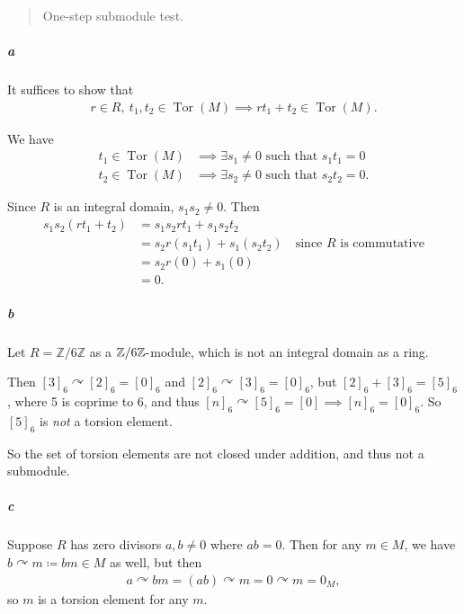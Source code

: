 \begin{solution}

\begin{quote}
One-step submodule test.
\end{quote}

\hypertarget{a-89}{%
\subparagraph{a}\label{a-89}}

It suffices to show that
\begin{align*}
r\in R, ~t_1, t_2\in \operatorname{Tor}(M) \implies rt_1 + t_2 \in \operatorname{Tor}(M)
.\end{align*}

We have
\begin{align*}
t_1 \in \operatorname{Tor}(M) &\implies \exists s_1 \neq 0 \text{ such that } s_1 t_1  = 0 \\
t_2 \in \operatorname{Tor}(M) &\implies \exists s_2 \neq 0 \text{ such that } s_2 t_2  = 0 
.\end{align*}

Since \(R\) is an integral domain, \(s_1 s_2 \neq 0\). Then
\begin{align*}
s_1 s_2(rt_1 + t_2) 
&= s_1 s_2 r t_1 + s_1 s_2t_2 \\
&= s_2 r (s_1 t_1) + s_1 (s_2 t_2)  \quad\text{since $R$ is commutative} \\
&=  s_2 r(0) + s_1(0) \\
&= 0
.\end{align*}

\hypertarget{b-79}{%
\subparagraph{b}\label{b-79}}

Let \(R = {\mathbb{Z}}/6{\mathbb{Z}}\) as a
\({\mathbb{Z}}/6{\mathbb{Z}}{\hbox{-}}\)module, which is not an integral
domain as a ring.

Then \([3]_6\curvearrowright[2]_6 = [0]_6\) and
\([2]_6\curvearrowright[3]_6 = [0]_6\), but \([2]_6 + [3]_6 = [5]_6\),
where 5 is coprime to 6, and thus
\([n]_6\curvearrowright[5]_6 = [0] \implies [n]_6 = [0]_6\). So
\([5]_6\) is \emph{not} a torsion element.

So the set of torsion elements are not closed under addition, and thus
not a submodule.

\hypertarget{c-51}{%
\subparagraph{c}\label{c-51}}

Suppose \(R\) has zero divisors \(a,b \neq 0\) where \(ab = 0\). Then
for any \(m\in M\), we have \(b\curvearrowright m \coloneqq bm \in M\)
as well, but then
\begin{align*}
a\curvearrowright bm = (ab)\curvearrowright m = 0\curvearrowright m = 0_M
,\end{align*}
so \(m\) is a torsion element for any \(m\).

\end{solution}

